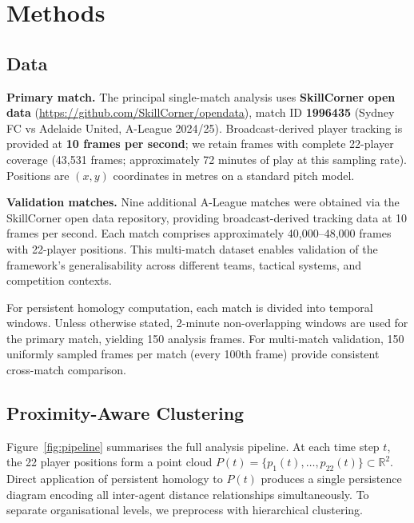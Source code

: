 \section{Methods}
\label{sec:methods}

\subsection{Data}

\textbf{Primary match.} The principal single-match analysis uses \textbf{SkillCorner open data} (\url{https://github.com/SkillCorner/opendata}), match ID \textbf{1996435} (Sydney FC vs Adelaide United, A-League 2024/25). Broadcast-derived player tracking is provided at \textbf{10 frames per second}; we retain frames with complete 22-player coverage (43{,}531 frames; approximately 72 minutes of play at this sampling rate). Positions are $(x,y)$ coordinates in metres on a standard pitch model.

\textbf{Validation matches.} Nine additional A-League matches were obtained via the SkillCorner open data repository, providing broadcast-derived tracking data at 10 frames per second. Each match comprises approximately 40,000--48,000 frames with 22-player positions. This multi-match dataset enables validation of the framework's generalisability across different teams, tactical systems, and competition contexts.

For persistent homology computation, each match is divided into temporal windows. Unless otherwise stated, 2-minute non-overlapping windows are used for the primary match, yielding 150 analysis frames. For multi-match validation, 150 uniformly sampled frames per match (every 100th frame) provide consistent cross-match comparison.

\subsection{Proximity-Aware Clustering}

Figure~\ref{fig:pipeline} summarises the full analysis pipeline. At each time step \(t\), the 22 player positions form a point cloud \(P(t)=\{p_1(t),\ldots,p_{22}(t)\}\subset\mathbb{R}^2\). Direct application of persistent homology to \(P(t)\) produces a single persistence diagram encoding all inter-agent distance relationships simultaneously. To separate organisational levels, we preprocess with hierarchical clustering.

